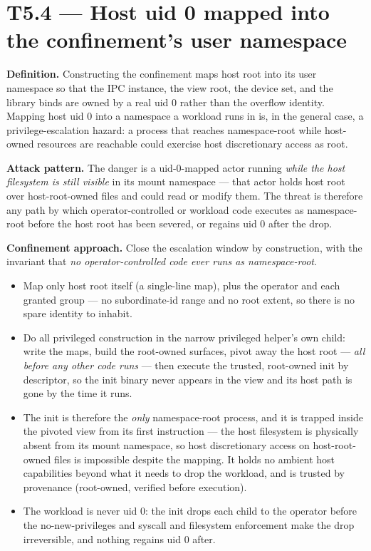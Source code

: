 \hypertarget{t5.4-host-uid-0-mapped-into-the-confinements-user-namespace}{%
\section{T5.4 --- Host uid 0 mapped into the confinement's user
namespace}\label{t5.4-host-uid-0-mapped-into-the-confinements-user-namespace}}

\textbf{Definition.} Constructing the confinement maps host root into
its user namespace so that the IPC instance, the view root, the device
set, and the library binds are owned by a real uid 0 rather than the
overflow identity. Mapping host uid 0 into a namespace a workload runs
in is, in the general case, a privilege-escalation hazard: a process
that reaches namespace-root while host-owned resources are reachable
could exercise host discretionary access as root.

\textbf{Attack pattern.} The danger is a uid-0-mapped actor running
\emph{while the host filesystem is still visible} in its mount namespace
--- that actor holds host root over host-root-owned files and could read
or modify them. The threat is therefore any path by which
operator-controlled or workload code executes as namespace-root before
the host root has been severed, or regains uid 0 after the drop.

\textbf{Confinement approach.} Close the escalation window by
construction, with the invariant that \emph{no operator-controlled code
ever runs as namespace-root}.

\begin{itemize}
\tightlist
\item
  Map only host root itself (a single-line map), plus the operator and
  each granted group --- no subordinate-id range and no root extent, so
  there is no spare identity to inhabit.
\item
  Do all privileged construction in the narrow privileged helper's own
  child: write the maps, build the root-owned surfaces, pivot away the
  host root --- \emph{all before any other code runs} --- then execute
  the trusted, root-owned init by descriptor, so the init binary never
  appears in the view and its host path is gone by the time it runs.
\item
  The init is therefore the \emph{only} namespace-root process, and it
  is trapped inside the pivoted view from its first instruction --- the
  host filesystem is physically absent from its mount namespace, so host
  discretionary access on host-root-owned files is impossible despite
  the mapping. It holds no ambient host capabilities beyond what it
  needs to drop the workload, and is trusted by provenance (root-owned,
  verified before execution).
\item
  The workload is never uid 0: the init drops each child to the operator
  before the no-new-privileges and syscall and filesystem enforcement
  make the drop irreversible, and nothing regains uid 0 after.
\end{itemize}

